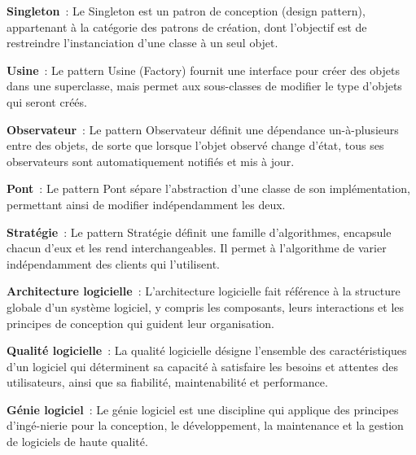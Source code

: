 \vspace{0.5cm}

\noindent \textbf{Singleton}~: Le Singleton est un patron de conception (design pattern), appartenant à la catégorie des patrons de création, dont l'objectif est de restreindre l'instanciation d'une classe à un seul objet.
\vspace{0.5cm}

\noindent \textbf{Usine}~: Le pattern Usine (Factory) fournit une interface pour créer des objets dans une superclasse, mais permet aux sous-classes de modifier le type d'objets qui seront créés.

\vspace{0.5cm}

\noindent \textbf{Observateur}~: Le pattern Observateur définit une dépendance un-à-plusieurs entre des objets, de sorte que lorsque l'objet observé change d'état, tous ses observateurs sont automatiquement notifiés et mis à jour.

\vspace{0.5cm}

\noindent \textbf{Pont}~: Le pattern Pont sépare l'abstraction d'une classe de son implémentation, permettant ainsi de modifier indépendamment les deux.

\newpage

\noindent \textbf{Stratégie}~: Le pattern Stratégie définit une famille d'algorithmes, encapsule chacun d'eux et les rend interchangeables. Il permet à l'algorithme de varier indépendamment des clients qui l'utilisent.

\vspace{0.5cm}

\noindent \textbf{Architecture logicielle}~: L'architecture logicielle fait référence à la structure globale d'un système logiciel, y compris les composants, leurs interactions et les principes de conception qui guident leur organisation.

\vspace{0.5cm}

\noindent \textbf{Qualité logicielle}~: La qualité logicielle désigne l'ensemble des caractéristiques d'un logiciel qui déterminent sa capacité à satisfaire les besoins et attentes des utilisateurs, ainsi que sa fiabilité, maintenabilité et performance.

\vspace{0.5cm}

\noindent \textbf{Génie logiciel}~: Le génie logiciel est une discipline qui applique des principes d'ingé-nierie pour la conception, le développement, la maintenance et la gestion de logiciels de haute qualité.

